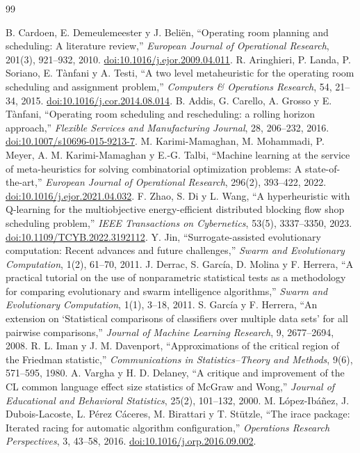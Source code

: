 \documentclass[11pt,a4paper]{article}
\newcounter{algorithm}
\begin{document}
\clearpage
\begin{thebibliography}{99}\small\raggedright
{} B. Cardoen, E. Demeulemeester y J. Beliën, ``Operating room planning and scheduling: A literature review,'' \emph{European Journal of Operational Research}, 201(3), 921--932, 2010. \href{https://doi.org/10.1016/j.ejor.2009.04.011}{doi:10.1016/j.ejor.2009.04.011}.
 R. Aringhieri, P. Landa, P. Soriano, E. Tànfani y A. Testi, ``A two level metaheuristic for the operating room scheduling and assignment problem,'' \emph{Computers \& Operations Research}, 54, 21--34, 2015. \href{https://doi.org/10.1016/j.cor.2014.08.014}{doi:10.1016/j.cor.2014.08.014}.
 B. Addis, G. Carello, A. Grosso y E. Tànfani, ``Operating room scheduling and rescheduling: a rolling horizon approach,'' \emph{Flexible Services and Manufacturing Journal}, 28, 206--232, 2016. \href{https://doi.org/10.1007/s10696-015-9213-7}{doi:10.1007/s10696-015-9213-7}.
 M. Karimi-Mamaghan, M. Mohammadi, P. Meyer, A. M. Karimi-Mamaghan y E.-G. Talbi, ``Machine learning at the service of meta-heuristics for solving combinatorial optimization problems: A state-of-the-art,'' \emph{European Journal of Operational Research}, 296(2), 393--422, 2022. \href{https://doi.org/10.1016/j.ejor.2021.04.032}{doi:10.1016/j.ejor.2021.04.032}.
 F. Zhao, S. Di y L. Wang, ``A hyperheuristic with Q-learning for the multiobjective energy-efficient distributed blocking flow shop scheduling problem,'' \emph{IEEE Transactions on Cybernetics}, 53(5), 3337--3350, 2023. \href{https://doi.org/10.1109/TCYB.2022.3192112}{doi:10.1109/TCYB.2022.3192112}.
 Y. Jin, ``Surrogate-assisted evolutionary computation: Recent advances and future challenges,'' \emph{Swarm and Evolutionary Computation}, 1(2), 61--70, 2011.
 J. Derrac, S. García, D. Molina y F. Herrera, ``A practical tutorial on the use of nonparametric statistical tests as a methodology for comparing evolutionary and swarm intelligence algorithms,'' \emph{Swarm and Evolutionary Computation}, 1(1), 3--18, 2011.
 S. García y F. Herrera, ``An extension on `Statistical comparisons of classifiers over multiple data sets' for all pairwise comparisons,'' \emph{Journal of Machine Learning Research}, 9, 2677--2694, 2008.
 R. L. Iman y J. M. Davenport, ``Approximations of the critical region of the Friedman statistic,'' \emph{Communications in Statistics--Theory and Methods}, 9(6), 571--595, 1980.
 A. Vargha y H. D. Delaney, ``A critique and improvement of the CL common language effect size statistics of McGraw and Wong,'' \emph{Journal of Educational and Behavioral Statistics}, 25(2), 101--132, 2000.
 M. López-Ibáñez, J. Dubois-Lacoste, L. Pérez Cáceres, M. Birattari y T. Stützle, ``The irace package: Iterated racing for automatic algorithm configuration,'' \emph{Operations Research Perspectives}, 3, 43--58, 2016. \href{https://doi.org/10.1016/j.orp.2016.09.002}{doi:10.1016/j.orp.2016.09.002}.
\end{thebibliography}
\end{document}
